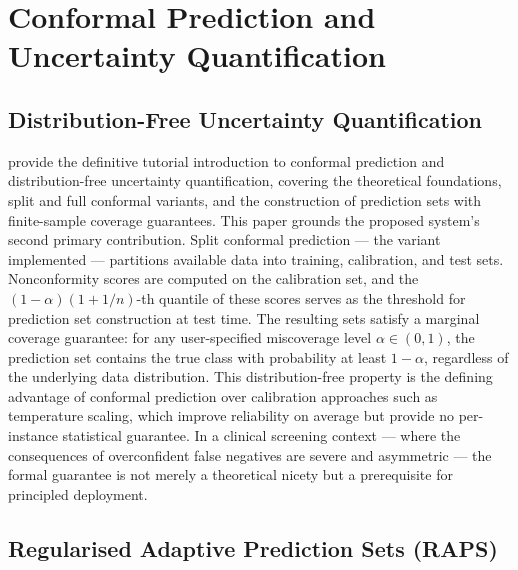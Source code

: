 \documentclass[12pt, a4paper]{article}
\begin{document}
\section{Conformal Prediction and Uncertainty Quantification}

\subsection{Distribution-Free Uncertainty Quantification}

\textcite{Angelopoulos2021} provide the definitive tutorial introduction to
conformal prediction and distribution-free uncertainty quantification,
covering the theoretical foundations, split and full conformal variants,
and the construction of prediction sets with finite-sample coverage
guarantees.
This paper grounds the proposed system's second primary contribution.
Split conformal prediction --- the variant implemented --- partitions
available data into training, calibration, and test sets.
Nonconformity scores are computed on the calibration set, and the
$(1{-}\alpha)(1{+}1/n)$-th quantile of these scores serves as the
threshold for prediction set construction at test time.
The resulting sets satisfy a marginal coverage guarantee: for any
user-specified miscoverage level $\alpha \in (0,1)$, the prediction
set contains the true class with probability at least $1{-}\alpha$,
regardless of the underlying data distribution.
This distribution-free property is the defining advantage of conformal
prediction over calibration approaches such as temperature scaling,
which improve reliability on average but provide no per-instance
statistical guarantee.
In a clinical screening context --- where the consequences of
overconfident false negatives are severe and asymmetric ---
the formal guarantee is not merely a theoretical nicety but a
prerequisite for principled deployment.

\subsection{Regularised Adaptive Prediction Sets (RAPS)}
\end{document}

